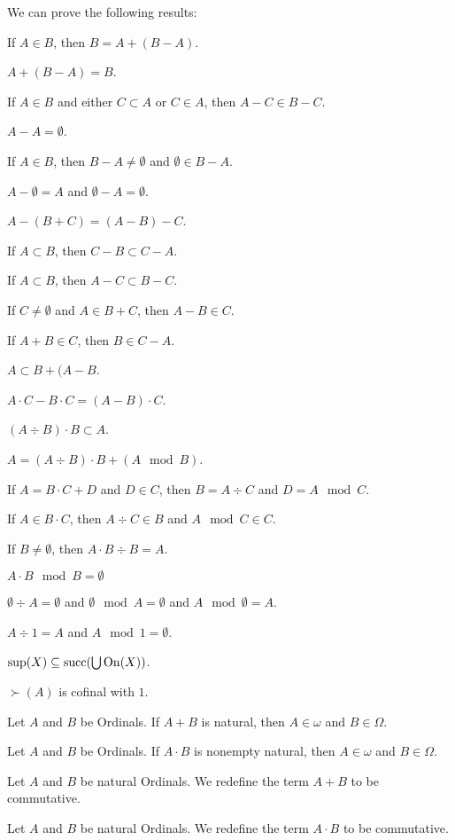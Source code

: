 \documentclass{article}
\begin{document}
We can prove the following results:
\begin{thm}
\item\label{ordinal3:51} If $A\in B$, then $B=A+(B-A)$.
\item\label{ordinal3:52} $A+(B-A)=B$.
\item\label{ordinal3:53} If $A\in B$ and either $C\subset A$ or $C\in A$,
  then $A-C\in B-C$.
\item\label{ordinal3:54} $A-A=\emptyset$.
\item\label{ordinal3:55} If $A\in B$, then $B-A\neq\emptyset$ and
  $\emptyset\in B-A$.
\item\label{ordinal3:56} $A-\emptyset=A$ and $\emptyset-A=\emptyset$.
\item\label{ordinal3:57} $A-(B+C)=(A-B)-C$.
\item\label{ordinal3:58} If $A\subset B$, then $C-B\subset C-A$.
\item\label{ordinal3:59} If $A\subset B$, then $A-C\subset B-C$.
\item\label{ordinal3:60} If $C\neq\emptyset$ and $A\in B+C$,
  then $A-B\in C$.
\item\label{ordinal3:61} If $A+B\in C$, then $B\in C-A$.
\item\label{ordinal3:62} $A\subset B+(A-B$.
\item\label{ordinal3:63} $A\cdot C-B\cdot C=(A-B)\cdot C$.
\item\label{ordinal3:64} $(A\div B)\cdot B\subset A$.
\item\label{ordinal3:65} $A=(A\div B)\cdot B+(A\mod B)$.
\item\label{ordinal3:66} If $A=B\cdot C+D$ and $D\in C$,
  then $B=A\div C$ and $D=A\mod C$.
\item\label{ordinal3:67} If $A\in B\cdot C$, then
  $A\div C\in B$ and $A\mod C\in C$.
\item\label{ordinal3:68} If $B\neq\emptyset$, then $A\cdot B\div B=A$.
\item\label{ordinal3:69} $A\cdot B\mod B=\emptyset$
\item\label{ordinal3:70} $\emptyset\div A=\emptyset$ and $\emptyset\mod A=\emptyset$
  and $A\mod\emptyset=A$.
\item\label{ordinal3:71} $A\div1=A$ and $A\mod1=\emptyset$.
\item\label{ordinal3:72} $\sup(X)\subseteq\operatorname{succ}(\bigcup\operatorname{On}(X))$.
\item\label{ordinal3:73} $\succ(A)$ is cofinal with $1$.
\item\label{ordinal3:74} Let $A$ and $B$ be Ordinals. If $A+B$ is
  natural, then $A\in\omega$ and $B\in\Omega$.
\item\label{ordinal3:75} Let $A$ and $B$ be Ordinals. If $A\cdot B$ is
  nonempty natural, then $A\in\omega$ and $B\in\Omega$.
\end{thm}

\begin{definition}
Let $A$ and $B$ be natural Ordinals.
We redefine the term $A+B$ to be commutative.
\end{definition}

\begin{definition}
Let $A$ and $B$ be natural Ordinals.
We redefine the term $A\cdot B$ to be commutative.
\end{definition}
\end{document}
